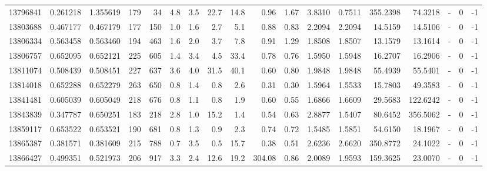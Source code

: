 \begin{tabular}{rrrrrrrrrrrrrrrlrr}
  13796841 & 0.261218 &   1.355619 &  179 &   34 &      4.8 &      3.5 &    22.7 &     14.8 &       0.96 &        1.67 &  3.8310 &  0.7511 &  355.2398 &   74.3218 &             - &        0 &         -1 \\
  13803688 & 0.467177 &   0.467179 &  177 &  150 &      1.0 &      1.6 &     2.7 &      5.1 &       0.88 &        0.83 &  2.2094 &  2.2094 &   14.5159 &   14.5106 &             - &        0 &         -1 \\
  13806334 & 0.563458 &   0.563460 &  194 &  463 &      1.6 &      2.0 &     3.7 &      7.8 &       0.91 &        1.29 &  1.8508 &  1.8507 &   13.1579 &   13.1614 &             - &        0 &         -1 \\
  13806757 & 0.652095 &   0.652121 &  225 &  605 &      1.4 &      3.4 &     4.5 &     33.4 &       0.78 &        0.76 &  1.5950 &  1.5948 &   16.2707 &   16.2906 &             - &        0 &         -1 \\
  13811074 & 0.508439 &   0.508451 &  227 &  637 &      3.6 &      4.0 &    31.5 &     40.1 &       0.60 &        0.80 &  1.9848 &  1.9848 &   55.4939 &   55.5401 &             - &        0 &         -1 \\
  13814018 & 0.652288 &   0.652279 &  263 &  650 &      0.8 &      1.4 &     0.8 &      2.6 &       0.31 &        0.30 &  1.5964 &  1.5533 &   15.7803 &   49.3583 &             - &        0 &         -1 \\
  13841481 & 0.605039 &   0.605049 &  218 &  676 &      0.8 &      1.1 &     0.8 &      1.9 &       0.60 &        0.55 &  1.6866 &  1.6609 &   29.5683 &  122.6242 &             - &        0 &         -1 \\
  13843839 & 0.347787 &   0.650251 &  183 &  218 &      2.8 &      1.0 &    15.2 &      1.4 &       0.54 &        0.63 &  2.8877 &  1.5407 &   80.6452 &  356.5062 &             - &        0 &         -1 \\
  13859117 & 0.653522 &   0.653521 &  190 &  681 &      0.8 &      1.3 &     0.9 &      2.3 &       0.74 &        0.72 &  1.5485 &  1.5851 &   54.6150 &   18.1967 &             - &        0 &         -1 \\
  13865387 & 0.381571 &   0.381609 &  215 &  788 &      0.7 &      3.5 &     0.5 &     15.7 &       0.38 &        0.51 &  2.6236 &  2.6620 &  350.8772 &   24.1022 &             - &        0 &         -1 \\
  13866427 & 0.499351 &   0.521973 &  206 &  917 &      3.3 &      2.4 &    12.6 &     19.2 &     304.08 &        0.86 &  2.0089 &  1.9593 &  159.3625 &   23.0070 &             - &        0 &         -1 \\

\end{tabular}
